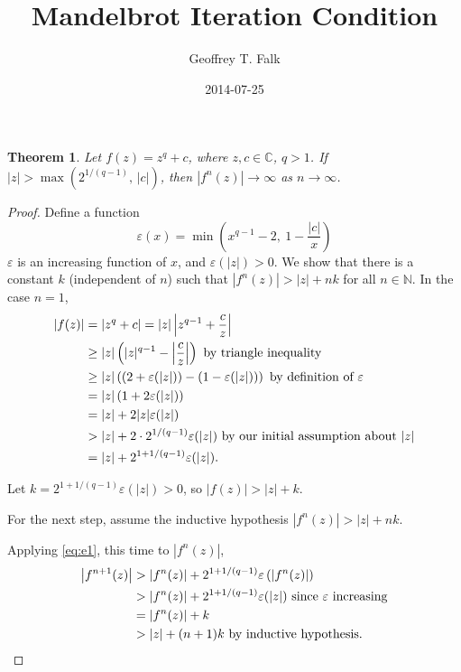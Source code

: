 \documentclass[11pt]{article}
\date{2014-07-25}
\author{Geoffrey T. Falk}
\title{Mandelbrot Iteration Condition}
\begin{document}

\maketitle

\newtheorem*{theorem}{Theorem}

\begin{theorem}
Let \( f(z) = z^q + c \), where \( z, c \in \mathbb{C} \), \( q > 1 \).
If \( |z| > \max\left(2^{1/(q-1)},\, |c|\right) \), then
\( |f^n(z)| \rightarrow \infty \) as \( n \rightarrow \infty \).
\end{theorem}

\begin{proof}
Define a function
\[
\varepsilon(x) = \min\left(x^{q-1} - 2,\ 1 - \frac{|c|}{x}\right)
\]
\( \varepsilon \) is an increasing function of \( x \), and \( \varepsilon(|z|) > 0 \).
We show that there is a constant \( k \) (independent of \( n \)) such that
\( |f^n(z)| > |z| + n k \) for all \( n \in \mathbb{N} \). In the case \( n = 1 \),
\begin{equation} \label{eq:e1}
\begin{aligned}
|f(z)| &= \left| z^q + c \right| = |z| \left| z^{q-1} + \frac{c}{z} \right| \\
&\geq |z| \left( |z|^{q-1} - {\left|\frac{c}{z}\right|} \right) \text{ by triangle inequality} \\
&\geq |z| \left( \left(2 + \varepsilon(|z|) \right) - \left(1 - \varepsilon(|z|)\right) \right)
 \text{ by definition of \( \varepsilon \)} \\
&= |z| \left(1 + 2 \varepsilon(|z|) \right) \\
&= |z| + 2 |z| \varepsilon(|z|) \\
&> |z| + 2 \cdot 2^{{1/(q-1)}} \varepsilon(|z|) \text{ by our initial assumption about } |z| \\
&= |z| + 2^{1 + {1/(q-1)}} \varepsilon(|z|).
\end{aligned}
\end{equation}

Let \( k = 2^{1 + {1/(q-1)}} \varepsilon(|z|) > 0 \), so \( |f(z)| > |z| + k \).
\parskip 6pt

For the next step, assume the inductive hypothesis \( |f^n(z)| > |z| + n k \).

Applying \eqref{eq:e1}, this time to \( |f^n(z)| \),
\begin{equation} \label{eq:e2}
\begin{aligned}
\left|f^{n+1}(z)\right| 
&> \left|f^n(z)\right| +  2^{1 + {1/(q-1)}} \varepsilon\left( \left|f^n(z)\right| \right) \\
&> \left|f^n(z)\right| + 2^{1 + {1/(q-1)}} \varepsilon(|z|) \text{ since \( \varepsilon \) increasing} \\
&= \left|f^n(z)\right| + k \\
&> |z| + (n+1)k \text{ by inductive hypothesis.}
\end{aligned}
\end{equation}
\end{proof}
\end{document}
